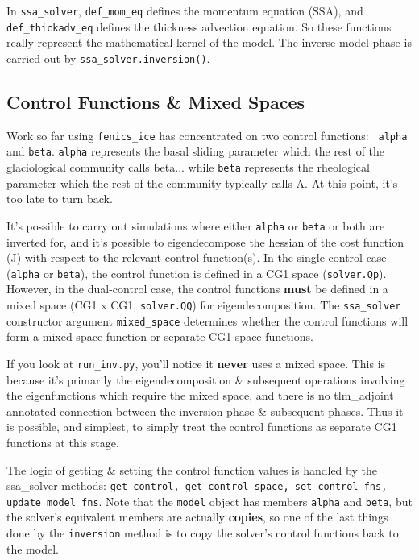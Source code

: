 \documentclass[11pt, reqno, nocenter]{article}
\begin{document}
In {\tt ssa\_solver}, {\tt def\_mom\_eq} defines the momentum equation (SSA), and {\tt def\_thickadv\_eq} defines the thickness advection equation. So these functions really represent the mathematical kernel of the model. The inverse model phase is carried out by {\tt ssa\_solver.inversion()}.

\subsection{Control Functions \& Mixed Spaces}

Work so far using {\tt fenics\_ice} has concentrated on two control functions: {\tt 
alpha} and {\tt beta}. {\tt alpha} represents the basal sliding parameter which the rest of the glaciological community calls beta... while {\tt beta} represents the rheological parameter which the rest of the community typically calls A. At this point, it's too late to turn back.

It's possible to carry out simulations where either {\tt alpha} or {\tt beta} or both are inverted for, and it's possible to eigendecompose the hessian of the cost function (J) with respect to the relevant control function(s). In the single-control case ({\tt alpha} or {\tt beta}), the control function is defined in a CG1 space ({\tt solver.Qp}). However, in the dual-control case, the control functions \textbf{must} be defined in a mixed space (CG1 x CG1, {\tt solver.QQ}) for eigendecomposition. The {\tt ssa\_solver} constructor argument {\tt mixed\_space} determines whether the control functions will form a mixed space function or separate CG1 space functions.

If you look at {\tt run\_inv.py}, you'll notice it \textbf{never} uses a mixed space.
This is because it's primarily the eigendecomposition \& subsequent operations involving the eigenfunctions which require the mixed space, and there is no tlm\_adjoint annotated connection between the inversion phase \& subsequent phases. Thus it is possible, and simplest, to simply treat the control functions as separate CG1 functions at this stage.

The logic of getting \& setting the control function values is handled by the ssa\_solver methods: {\tt get\_control, get\_control\_space, set\_control\_fns, update\_model\_fns}. Note that the {\tt model} object has members {\tt alpha} and {\tt beta}, but the solver's equivalent members are actually \textbf{copies}, so one of the last things done by the {\tt inversion} method is to copy the solver's control functions back to the model.
\end{document}
